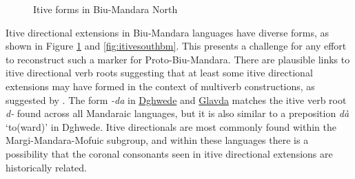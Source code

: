 \begin{figure}[b]
	\caption{Itive forms in Biu-Mandara North} \label{fig:itivebm}
\end{figure}

Itive directional extensions in Biu-Mandara languages have diverse forms, as shown in Figure \ref{fig:itivebm} and \ref{fig:itivesouthbm}. This presents a challenge for any effort to reconstruct such a marker for Proto-Biu-Mandara. There are plausible links to itive directional verb roots suggesting that at least some itive directional extensions may have formed in the context of multiverb constructions, as suggested by \citet{frajzyngierVentiveCentrifugalChadic1987}. The form \textit{-da} in \hyperref[dghw]{Dghwede} and \hyperref[glav]{Glavda} matches the itive verb root \textit{d-} found across all Mandaraic languages, but it is also similar to a preposition \textit{dà} `to(ward)' in Dghwede. Itive directionals are most commonly found within the Margi-Mandara-Mofuic subgroup, and within these languages there is a possibility that the coronal consonants seen in itive directional extensions are historically related.

